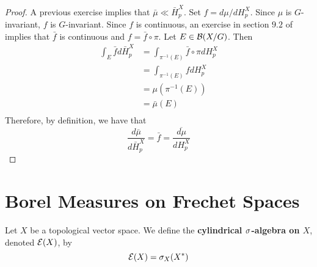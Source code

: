 \documentclass{book}
\begin{document}
	\begin{proof}
	A previous exercise implies that $\bar{\mu} \ll \bar{H}_p^X$. Set $f = d \mu /d H_p^X$. Since $\mu$ is $G$-invariant, $f$ is $G$-invariant. Since $f$ is continuous, an exercise in section $9.2$ of \cite{analysis} implies that $\bar{f}$ is continuous and $f = \bar{f} \circ \pi$. Let $E \in \mathcal{B}(X/G)$. Then 
	\begin{align*}
	\int_E \bar{f} d \bar{H}_p^X 
	&= \int_{\pi^{-1}(E)} \bar{f} \circ \pi dH_p^X \\
	&= \int_{\pi^{-1}(E)} f dH_p^X \\
	&= \mu(\pi^{-1}(E)) \\
	&= \bar{\mu}(E) \\
\end{align*}	 
	Therefore, by definition, we have that
	\begin{equation*}
	\frac{d \bar{\mu}}{d \bar{H}_p^X} = \bar{f} = \overline{\frac{d \mu}{d H_p^X}}
	\end{equation*}
	\end{proof}
	
	
	
	
	
	
	
	
	
	
	
	
	
	
	
	
	
	
	
	
	
	
	
	
	
	

	
	
	
	
	
	
	
	
	
	
	
	
	
	
	
	
	
	
	
	
	
	\section{Borel Measures on Frechet Spaces}
	
	\begin{defn}
		Let $X$ be a topological vector space. We define the \textbf{cylindrical $\sigma$-algebra on $X$}, denoted $\mathcal{E}(X)$, by $$\mathcal{E}(X) = \sigma_X(X^*)$$
	\end{defn}
\end{document}
